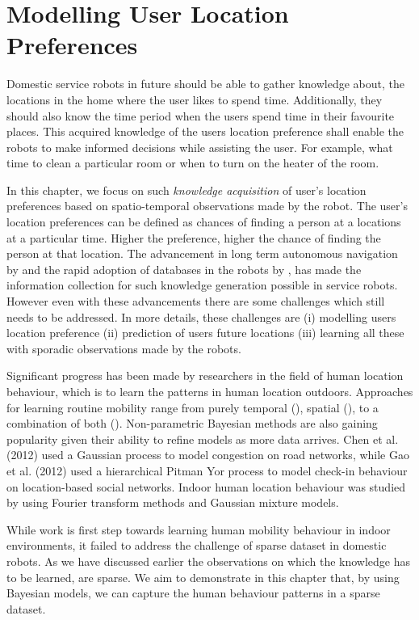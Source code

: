 \chapter{Modelling User Location Preferences }
\label{chapter:Human location}
Domestic service robots in future should be able to gather knowledge about, the locations in the home where the user likes to spend time. Additionally, they should also know the time period when the users spend time in their favourite places. This acquired knowledge of the users location preference shall enable the robots to make informed decisions while assisting the user. For example, what time to clean a particular room or when to turn on the heater of the room. 

In this chapter, we focus on such \emph{knowledge acquisition} of user's location preferences based on spatio-temporal observations made by the robot. The user's location preferences can be defined as chances of finding a person at a locations at a particular time. Higher the preference, higher the chance of finding the person at that location. The advancement in long term autonomous navigation by \cite{krajnik_life-long_2015} and the rapid adoption of databases in the robots by \cite{niemueller2012generic}, has made the information collection for such knowledge generation possible in service robots. However even with these advancements there are some challenges which still needs to be addressed.  In more details, these challenges are  (i) modelling users location preference  (ii) prediction of users future locations  (iii) learning all these with sporadic observations made by the robots. 

Significant progress has been made by researchers in the field of human location behaviour, which is to learn the patterns in human location outdoors. Approaches for learning routine mobility  range from purely temporal  (\cite{mcinerney2013modelling, scellato2011nextplace}), spatial  (\cite{gao2012exploring,song2006evaluating}), to a combination  of  both   (\cite{eagle2009eigenbehaviors}). Non-parametric Bayesian methods are also gaining popularity given their ability to refine models as more data arrives. Chen et al.  (2012) used a Gaussian process to model congestion on road networks, while Gao et al.  (2012) used a hierarchical Pitman Yor process to model check-in behaviour on location-based social networks. Indoor human location behaviour was studied by \cite{krajnik_wheres_2015} using Fourier transform methods and Gaussian mixture models. 

While \cite{krajnik_wheres_2015}  work is first step towards learning human mobility behaviour in indoor environments, it failed to address the challenge of sparse dataset in domestic robots. As we have discussed earlier the observations on which the knowledge has to be learned, are sparse. We aim to demonstrate in this chapter that, by using Bayesian models, we can capture the human behaviour patterns in a sparse dataset.

